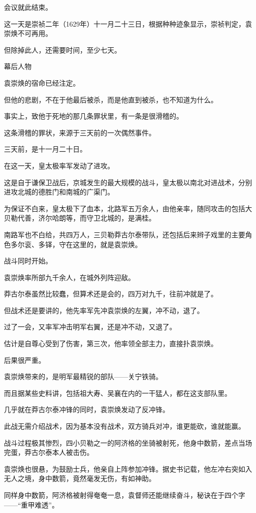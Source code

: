 \begin{multicols}{\theparacolNo}
会议就此结束。

这一天是崇祯二年（1629年）十一月二十三日，根据种种迹象显示，崇祯判定，袁崇焕不可再用。

但除掉此人，还需要时间，至少七天。

幕后人物

袁崇焕的宿命已经注定。

但他的悲剧，不在于他最后被杀，而是他直到被杀，也不知道为什么。

事实上，致他于死地的那几条罪状里，有一条是很滑稽的。

这条滑稽的罪状，来源于三天前的一次偶然事件。

三天前，是十一月二十日。

在这一天，皇太极率军发动了进攻。

这是自于谦保卫战后，京城发生的最大规模的战斗，皇太极以南北对进战术，分别进攻北城的德胜门和南城的广渠门。

为保证不白来，皇太极下了血本，北路军五万余人，由他亲率，随同攻击的包括大贝勒代善，济尔哈朗等，而守卫北城的，是满桂。

南路军也不白给，共四万人，三贝勒莽古尔泰带队，还包括后来辫子戏里的主要角色多尔衮、多铎，守在这里的，就是袁崇焕。

战斗同时开始。

袁崇焕率所部九千余人，在城外列阵迎敌。

莽古尔泰虽然比较蠢，但算术还是会的，四万对九千，往前冲就是了。

但战术还是要讲的，他先率军先冲袁崇焕的左翼，冲不动，退了。

过了一会，又率军冲击明军右翼，还是冲不动，又退了。

估计是自尊心受到了伤害，第三次，他率领全部主力，直接扑袁崇焕。

后果很严重。

袁崇焕带来的，是明军最精锐的部队——关宁铁骑。

而且据某些史料讲，包括祖大寿、吴襄在内的一干猛人，都在这支部队里。

几乎就在莽古尔泰冲锋的同时，袁崇焕发动了反冲锋。

此战无需介绍战术，因为基本没有战术，双方骑兵对冲，谁更能砍，谁就能赢。

战斗过程极其惨烈，四小贝勒之一的阿济格的坐骑被射死，他身中数箭，差点当场完蛋，莽古尔泰本人被击伤。

袁崇焕也很悬，为鼓励士兵，他亲自上阵参加冲锋。据史书记载，他左冲右突如入无人之境，身中数箭，竟然毫发无伤，有如神助。

同样身中数箭，阿济格被射得奄奄一息，袁督师还能继续奋斗，秘诀在于四个字——“重甲难透”。


\end{multicols}
